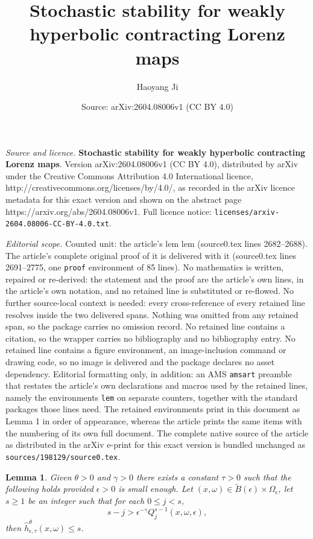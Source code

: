 \documentclass[10pt,a4paper]{amsart}
\title{\Large{\bf{{Stochastic stability for weakly hyperbolic contracting Lorenz maps}}}}
\author{Haoyang Ji}
\date{Source: arXiv:2604.08006v1 (CC BY 4.0)}
\newtheorem{lem}{Lemma}
\begin{document}
\maketitle

\noindent\emph{Source and licence.} \Large{\bf{{Stochastic stability for weakly hyperbolic contracting Lorenz maps}}}. Version arXiv:2604.08006v1 (CC BY 4.0), distributed by arXiv under the Creative Commons Attribution 4.0 International licence, http://creativecommons.org/licenses/by/4.0/, as recorded in the arXiv licence metadata for this exact version and shown on the abstract page https://arxiv.org/abs/2604.08006v1. Full licence notice: \texttt{licenses/arxiv-2604.08006-CC-BY-4.0.txt}.\par\smallskip

\noindent\textit{Editorial scope.} Counted unit: the article's lem lem (source0.tex lines 2682--2688). The article's complete original proof of it is delivered with it (source0.tex lines 2691--2775, one \texttt{proof} environment of 85 lines). No mathematics is written, repaired or re-derived: the statement and the proof are the article's own lines, in the article's own notation, and no retained line is substituted or re-flowed.  No further source-local context is needed: every cross-reference of every retained line resolves inside the two delivered spans.  Nothing was omitted from any retained span, so the package carries no omission record.  No retained line contains a citation, so the wrapper carries no bibliography and no bibliography entry.  No retained line contains a figure environment, an image-inclusion command or drawing code, so no image is delivered and the package declares no asset dependency.  Editorial formatting only, in addition: an AMS \texttt{amsart} preamble that restates the article's own declarations and macros used by the retained lines, namely the environments \texttt{lem} on separate counters, together with the standard packages those lines need.  The retained environments print in this document as Lemma 1 in order of appearance, whereas the article prints the same items with the numbering of its own full document.  The complete native source of the article as distributed in the arXiv e-print for this exact version is bundled unchanged as \texttt{sources/198129/source0.tex}.
\begin{lem}
Given $\theta > 0$ and $\gamma > 0$ there exists a constant $\tau > 0$ such that the following holds provided $\epsilon > 0$ is small enough. Let $(x, \omega) \in \tilde B(\epsilon) \times \Omega_{\epsilon}$, let $s \geq 1$ be an integer such that for each $0 \leq j < s$, 
\begin{equation}
s - j > \epsilon^{- \gamma} Q_{j}^{s-1} (x, \omega, \epsilon),
\end{equation}
then $\hat h_{\epsilon, \tau}^{\theta} (x, \omega) \leq s$.
\end{lem}
\end{document}
